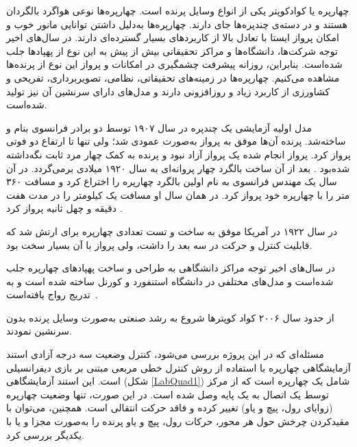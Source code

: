 


چهارپره یا کوادکوپتر یکی از انواع وسایل پرنده است. چهارپره‌ها نوعی هواگرد بالگردان هستند و در دسته‌ی چندپره‌ها جای دارند.
  چهارپره‌ها به‌دلیل داشتن توانایی مانور خوب و امکان پرواز ایستا با تعادل بالا از کاربردهای بسیار گسترده‌ای دارند.
در سال‌های اخیر توجه شرکت‌ها، دانشگاه‌ها و مراکز تحقیقاتی بیش از پیش به این نوع از پهپادها جلب شده‌است. بنابراین، روزانه پیشرفت چشمگیری
 در امکانات و پرواز این نوع از پرنده‌ها مشاهده می‌کنیم. چهارپره‌ها در زمینه‌های تحقیقاتی، نظامی، تصویربرداری، تفریحی و کشاورزی از کاربرد زیاد و روزافزونی دارند و مدل‌های دارای سرنشین آن نیز تولید شده‌است‌.





مدل‬ اولیه آزمایشی یک چندپره در سال ۱۹۰۷ توسط دو برادر فرانسوی بنام
  و 
  ساخته‌شد. پرنده آن‌ها موفق به پرواز به‌صورت عمودی شد؛ ولی تنها تا ارتفاع دو فوتی پرواز کرد. پرواز انجام شده یک پرواز آزاد
  نبود و پرنده به کمک چهار مرد ثابت نگه‌داشته شده‌بود \cite{Sprekelmeyer}.
  بعد از آن ساخت بالگرد چهار پروانه‌ای به سال ۱۹۲۰ میلادی برمی‌گردد. در آن سال یک مهندس فرانسوی به نام  اولین بالگرد چهارپره را اختراع کرد و مسافت ۳۶۰ متر را با چهارپره خود پرواز کرد. در همان سال او مسافت یک کیلومتر را در مدت هفت دقیقه و چهل ثانیه پرواز کرد \cite{10.2307/44729509}.

در  سال ۱۹۲۲ در آمریکا  موفق به ساخت و تست تعدادی چهارپره برای ارتش شد که قابلیت کنترل و حرکت در سه بعد را داشت، ولی پرواز با آن بسیار سخت بود.

در سال‌های اخیر توجه مراکز دانشگاهی به طراحی و ساخت پهپادهای چهارپره جلب شده‌است و مدل‌های مختلفی در دانشگاه استنفورد و کورنل ساخته شده است و به تدریج رواج یافته‌است~\cite{5717652}.

از حدود سال ۲۰۰۶ کواد کوپترها شروع به رشد صنعتی به‌صورت وسایل پرنده بدون سرنشین نمودند.


مسئله‌ای که در این پروژه بررسی می‌شود، کنترل وضعیت سه درجه آزادی استند آزمایشگاهی چهارپره با استفاده از روش کنترل خطی مربعی مبتنی بر بازی دیفرانسیلی است. این استند آزمایشگاهی (شکل \ref{LabQuad1}) شامل یک چهارپره است که از 
مرکز توسط یک اتصال به یک پایه وصل شده است. در این صورت، تنها وضعیت چهارپره (زوایای رول، پیچ و یاو) 
 تغییر کرده و فاقد حرکت انتقالی است. همچنین، می‌توان با مقیدکردن چرخش حول هر محور، 
حرکات رول، پیچ و یاو  پرنده را به‌صورت مجزا و یا با یکدیگر بررسی کرد.

